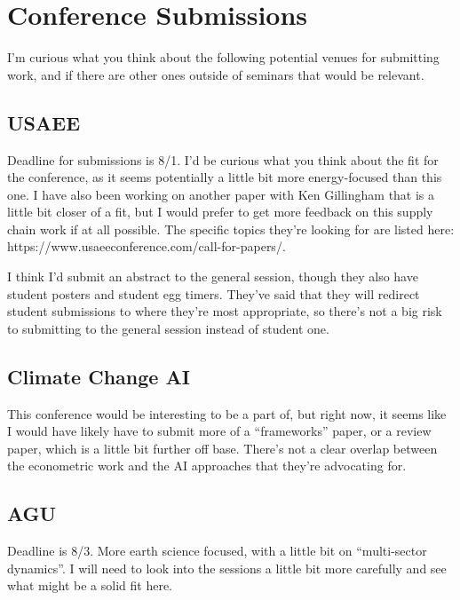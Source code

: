 \documentclass[11pt]{article}
\begin{document}
	
	
	\section*{Conference Submissions}
	I'm curious what you think about the following potential venues for submitting work, and if there are other ones outside of seminars that would be relevant.
	
	
	\subsection*{USAEE}
	Deadline for submissions is 8/1. I'd be curious what you think about the fit for the conference, as it seems potentially a little bit more energy-focused than this one. I have also been working on another paper with Ken Gillingham that is a little bit closer of a fit, but I would prefer to get more feedback on this supply chain work if at all possible. The specific topics they're looking for are listed here: https://www.usaeeconference.com/call-for-papers/. 
	
	I think I'd submit an abstract to the general session, though they also have student posters and student egg timers. They've said that they will redirect student submissions to where they're most appropriate, so there's not a big risk to submitting to the general session instead of student one.
	
	\subsection*{Climate Change AI}
	This conference would be interesting to be a part of, but right now, it seems like I would have likely have to submit more of a ``frameworks'' paper, or a review paper, which is a little bit further off base. There's not a clear overlap between the econometric work and the AI approaches that they're advocating for.
	
	
	\subsection*{AGU}
	Deadline is 8/3. More earth science focused, with a little bit on ``multi-sector dynamics''. I will need to look into the sessions a little bit more carefully and see what might be a solid fit here.
	
	
\end{document}
